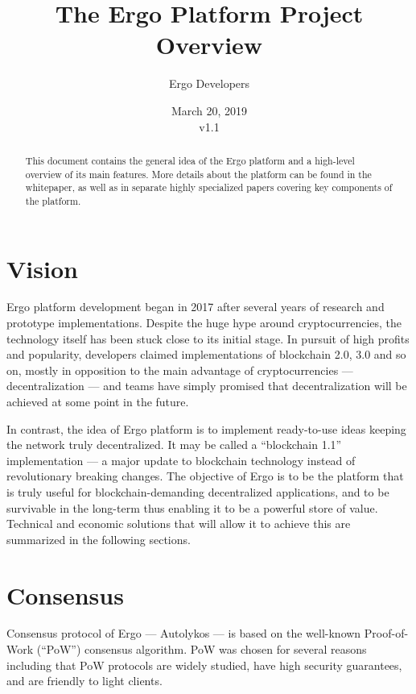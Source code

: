 \documentclass[]{article}
\begin{document}
    \title{The Ergo Platform Project Overview}
    \author{Ergo Developers}

    \date{March 20, 2019\\v1.1}

    \maketitle

    \begin{abstract}
        This document contains the general idea of the Ergo platform and a high-level overview of its main
        features. More details about the platform can be found in the whitepaper, as well as in
        separate highly specialized papers covering key components of the platform.
    \end{abstract}

    \section{Vision}

    Ergo platform development began in 2017 after several years of research and prototype
    implementations. Despite the huge hype around cryptocurrencies, the technology itself has
    been stuck close to its initial stage. In pursuit of high profits and popularity, developers claimed
    implementations of blockchain 2.0, 3.0 and so on, mostly in opposition to the main advantage of
    cryptocurrencies --- decentralization --- and teams have simply promised that decentralization will
    be achieved at some point in the future.

    In contrast, the idea of Ergo platform is to implement ready-to-use ideas keeping the network
    truly decentralized. It may be called a ``blockchain 1.1'' implementation --- a major update to
    blockchain technology instead of revolutionary breaking changes. The objective of Ergo is to be
    the platform that is truly useful for blockchain-demanding decentralized applications, and to be
    survivable in the long-term thus enabling it to be a powerful store of value. Technical and economic
    solutions that will allow it to achieve this are summarized in the following sections.

    \section{Consensus}

    Consensus protocol of Ergo --- Autolykos --- is based on the well-known
    Proof-of-Work (``PoW'')
    consensus algorithm. PoW was chosen for several reasons including that PoW protocols are widely
    studied, have high security guarantees, and are friendly to light clients.
\end{document}
